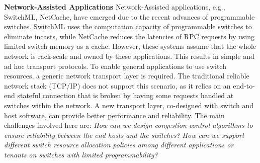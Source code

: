 \documentclass[10pt]{article}
\begin{document}

\textbf{Network-Assisted Applications}
Network-Assisted applications, e.g., SwitchML, NetCache,  
have emerged due to the recent advances of programmable
switches. SwitchML uses the computation capacity of programmable switches 
to eliminate  incasts, while NetCache reduces the latencies of RPC requests by using limited switch memory as a cache.
However, these systems assume that the whole network is rack-scale and owned by these applications.
This results in simple and ad hoc transport protocols. To enable general applications to use switch resources, a generic network transport layer is required. The traditional reliable network stack (TCP/IP) does not support this scenario, as it relies on an end-to-end stateful connection that is broken by having some requests handled at switches within the network. A new transport layer, co-designed with switch and host software, can provide better performance and reliability. The main challenges involved here are: {\it How can we design congestion control algorithms to ensure reliability between the end hosts and the switches? How can we support different switch resource allocation policies among different applications or tenants on switches with limited programmability?}
\end{document}
